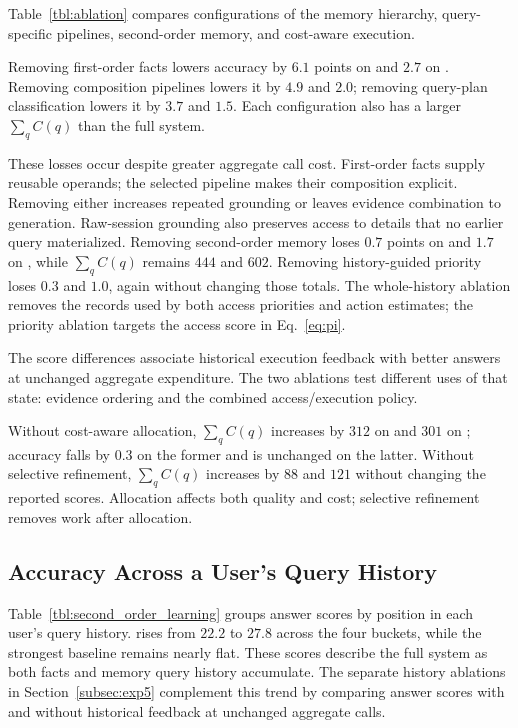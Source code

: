 Table~\ref{tbl:ablation} compares configurations of the memory
hierarchy, query-specific pipelines, second-order memory,
and cost-aware execution.

Removing first-order facts lowers accuracy by $6.1$ points on
\membench{} and $2.7$ on \lmev{}.
Removing composition pipelines lowers it by $4.9$ and $2.0$; removing query-plan classification
lowers it by $3.7$ and $1.5$.
Each configuration also has a larger $\sum_q C(q)$ than the full system.

These losses occur despite greater aggregate call cost. First-order
facts supply reusable operands; the selected pipeline makes their
composition explicit. Removing either increases repeated grounding or
leaves evidence combination to generation. Raw-session grounding also
preserves access to details that no earlier query materialized.
Removing second-order memory loses $0.7$ points on \membench{} and
$1.7$ on \lmev{}, while $\sum_q C(q)$ remains $444$ and $602$.
Removing history-guided priority loses $0.3$ and $1.0$, again without changing
those totals. The whole-history ablation removes the records used by
both access priorities and action estimates; the priority ablation
targets the access score in Eq.~\eqref{eq:pi}.

The score differences associate historical execution feedback with better
answers at unchanged aggregate expenditure. The two ablations test
different uses of that state: evidence ordering and the combined
access/execution policy.

Without cost-aware allocation, $\sum_q C(q)$ increases by $312$
on \membench{} and $301$ on \lmev{}; accuracy falls by $0.3$ on the
former and is unchanged on the latter.
Without selective refinement, $\sum_q C(q)$ increases by $88$ and $121$
without changing the reported scores. Allocation affects both quality and
cost; selective refinement removes work after allocation.



\subsection{Accuracy Across a User's Query History}
\label{subsec:exp6}

Table~\ref{tbl:second_order_learning} groups \evomem{} answer scores by
position in each user's query history. \sys{} rises from $22.2$ to
$27.8$ across the four buckets, while the strongest baseline remains
nearly flat. These scores describe the full system as both facts and
memory query history accumulate. The separate history ablations
in Section~\ref{subsec:exp5} complement this trend by comparing answer
scores with and without historical feedback at unchanged aggregate calls.

